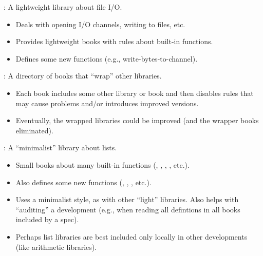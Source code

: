 
\begin{frame}

\newlibtitle

:
A lightweight library about file I/O.
\begin{itemize}
\item Deals with opening I/O channels, writing to files, etc.
\item Provides lightweight books with rules about built-in functions.
\item Defines some new functions (e.g., write-bytes-to-channel).
\end{itemize}

\separation

:
A directory of books that ``wrap'' other libraries.
\begin{itemize}
\item Each book includes some other library or book and then disables rules that may cause problems and/or introduces improved versions.
\item Eventually, the wrapped libraries could be improved (and the wrapper books eliminated).
\end{itemize}

\end{frame}


\begin{frame}

\newlibtitle

:
A ``minimalist'' library about lists.
\begin{itemize}
\item Small books about many built-in functions (, , ,
  , etc.).
\item Also defines some new functions (, , , etc.).
\item Uses a minimalist style, as with other ``light'' libraries.  Also helps with
  ``auditing'' a development (e.g., when reading all defintions in all books included
   by a spec).
\item Perhaps list libraries are best included only locally in other
  developments (like arithmetic libraries).
\end{itemize}

\end{frame}

